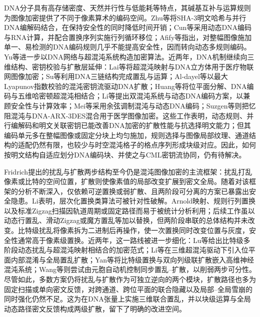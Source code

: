 DNA分子具有高存储密度、天然并行性与低能耗等特点，其碱基互补与运算规则为图像加密提供了不同于像素算术的编码空间\cite{Yan2023ColorDNA,Huang2025DNAEncoding}。Zhu等将SHA-3明文哈希与并行DNA编解码结合，在保持安全性的同时降低时间开销\cite{Zhu2023ParallelDNA}；Cun等采用动态DNA编码与RNA计算，并配合置换序列实施行列循环移位\cite{Cun2023DNARNA}；Afify等指出，对整幅图像施加单一、易检测的DNA编码规则几乎不能提高安全性，因而转向动态多规则编码\cite{Afify2024DynamicDNA}。Yu等进一步以DNA网络与超混沌系统构造加密算法\cite{Yu2024DNANetwork}。近两年，DNA机制继续向三维结构、密钥校验与扩散层延伸：Lai等将超混沌映射与DNA立方体用于医疗物联网图像加密\cite{Lai2025DNACubes}；Su等利用DNA三链结构完成置乱与运算\cite{Su2025ThreeStrandDNA}；Al-dayel等以最大Lyapunov指数校验的混沌密钥流驱动DNA扩散\cite{Aldayel2025LLEDNA}；Huang等将位平面分解、DNA编码与五维哈密顿超混沌相结合\cite{Huang2025DNAEncoding}；Li等提出双混沌系统与动态DNA编码方案，以兼顾安全性与计算效率\cite{Li2026DynamicDNA}；Mei等采用余弦调制混沌与动态DNA编码\cite{Mei2026DynamicDNA}；Suzgen等则把忆阻混沌与DNA-ARX-3DES混合用于医学图像加密\cite{Suzgen2026MemristiveDNA}。这些工作表明，动态规则、并行编解码和明文关联密钥已能改善DNA加密的扩散性能与抗选择明文能力；但其编码单元多在整幅图像或固定分块上均匀施加，规则选择与图像局部纹理、通道结构的适配仍然有限，也较少与时空混沌格子的格点序列形成块级对应。因此，如何按明文结构自适应划分DNA编码块、并使之与CML密钥流协同，仍有待解决。

Fridrich提出的扰乱与扩散两步结构至今仍是混沌图像加密的主流框架：扰乱打乱像素或比特的空间位置，扩散则使像素值的局部改变扩展到密文全局\cite{Fridrich1998SymmetricCiphers,Chen2004CatMaps}。随着对该框架的分析不断深入，仅依赖可逆置换或弱扩散、且两阶段可分离的方案已暴露出安全隐患。Li表明，层次化置换类算法可被针对性破解\cite{Li2016CrackingPermutation}。Arnold映射、规则行列置换以及标准Zigzag扫描因轨道周期或固定路径而易于被统计分析利用；后续工作虽以动态行置乱、滑动Zigzag或魔方置乱等加以替换\cite{Wang2021Zigzag,Yang2025SlideZigzag,Sharmila2025Rubik}，但两阶段串联的总体结构并未改变。比特级扰乱将像素拆为二进制后再操作，使一次置换同时改变位置与灰度，安全性通常高于像素级置换\cite{Zhu2011BitLevel,Xu2016BitLevel}。近两年，这一路线被进一步细化：Lu等给出比特级多阶段动态扰乱与超混沌映射相结合的加密范式\cite{Lu2026BitLevelScramble}；Li等在三维超混沌驱动下引入位平面内部混淆与全局置乱扩散\cite{Li2025BitPlane}；Yan等将比特级置换与双向列级联扩散嵌入高维神经混沌系统\cite{Yan2026BitLevelDiffusion}；Wang等则尝试由元胞自动机控制同步置乱--扩散，以削弱两步可分性\cite{Wang2025SCOCML}。尽管如此，多数方案仍将扰乱与扩散作为可独立逆向的两个模块，扩散路径也多为固定扫描或单向密文反馈，对跨通道、跨位平面的联合隐藏以及局部--全局雪崩的同时强化仍然不足。这为在DNA张量上实施三维联合置乱，并以块级运算与全局动态路径密文反馈构成两级扩散，留下了明确的改进空间。

